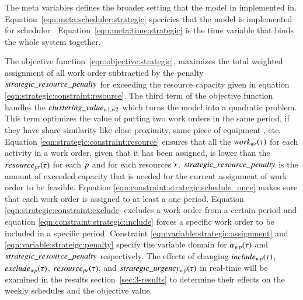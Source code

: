The meta variables defines the broader setting that the model in implemented in.
Equation~\eqref{eqn:meta:scheduler:strategic} specicies that the model is
implemented for scheduler \ElementScheduler. 
Equation~\eqref{eqn:meta:time:strategic} is the time variable that binds the whole
system together.

The objective function~\eqref{eqn:objective:strategic},  maximizes the total
weighted assignment of all work order subtractied by the penalty $strategic\_resource\_penalty$
for exceeding the resource capacity given in equation
\eqref{eqn:strategic:constraint:resource}. The third term of the objective
function handles the $clustering\_value_{w1, w2}$ which turns the model into a quadratic
problem. This term optimizes the value of putting two work orders in the same
period, if they have share similarity like close proximity, same piece of equipment
, etc.  Equation \eqref{eqn:strategic:constraint:resource} ensures
that all the $work_{wr}(\tau)$ for each activity in a work
order, given that it has been assigned, is lower than the $\ParStrategicResource$ for each
$p$ and for each resources $r$. $strategic\_resource\_penalty$ is the
amount of exceeded capacity that is needed for the current assignment of work
order to be feasible. Equation \eqref{eqn:constraint:strategic:schedule_once}
makes sure that each work order is assigned to at least a one
period. Equation \eqref{eqn:strategic:constraint:exclude}
excludes a work order from a certain period and equation
\eqref{eqn:constraint:strategic:include} forces a specific work order to be
included in a specific period. Constraint \eqref{eqn:variable:strategic:assignment}
and \eqref{eqn:variable:strateigc:penalty} specify the variable domain
for $\alpha_{wp}(\tau)$
and $strategic\_resource\_penalty$ respectively. The effects of changing $
include_{wp}(\tau)$, $exclude_{wp}(\tau)$, $\ParStrategicResource$, and $
strategic\_urgency_{w p}(\tau)$ in real-time will be examined in the results section~\ref{sec:3-results} to
determine their effects on the weekly schedules and the objective value.

